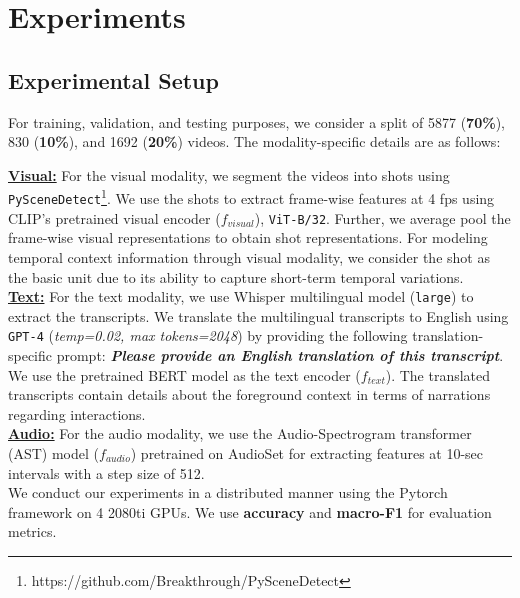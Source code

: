 \section{Experiments}
\subsection{Experimental Setup}
For training, validation, and testing purposes, we consider a split of 5877 (\textbf{70\%}), 830 (\textbf{10\%}), and 1692 (\textbf{20\%}) videos. The modality-specific details are as follows:

\textbf{\underline{Visual:}} For the visual modality, we segment the videos into shots using \texttt{PySceneDetect}\footnote{https://github.com/Breakthrough/PySceneDetect}. We use the shots to extract frame-wise features at 4 fps using CLIP's \cite{Radford2021LearningTV} pretrained visual encoder ($f_{visual}$), \texttt{ViT-B/32}. Further, we average pool the frame-wise visual representations to obtain shot representations. For modeling temporal context information through visual modality, we consider the shot as the basic unit due to its ability to capture short-term temporal variations. \\
 \textbf{\underline{Text:}} For the text modality, we use Whisper \cite{Radford2022RobustSR} multilingual model (\texttt{large}) to extract the transcripts.  We translate the multilingual transcripts to English using \texttt{GPT-4} \cite{OpenAI2023GPT4TR} (\textit{temp=0.02, max tokens=2048}) by providing the following translation-specific prompt: \textit{\textbf{Please provide an English translation of this transcript}}. We use the pretrained BERT\cite{Devlin2019BERTPO} model as the text encoder ($f_{text}$). The translated transcripts contain details about the foreground context in terms of narrations regarding interactions.\\
 \textbf{\underline{Audio:}} For the audio modality, we use the Audio-Spectrogram transformer (AST) \cite{gong21b_interspeech} model ($f_{audio}$) pretrained on AudioSet \cite{Gemmeke2017AudioSA} for extracting features at 10-sec intervals with a step size of 512.  \\
 We conduct our experiments in a distributed manner using the Pytorch \cite{Paszke2019PyTorchAI} framework on 4 2080ti GPUs. We use \textbf{accuracy} and \textbf{macro-F1} for evaluation metrics.
